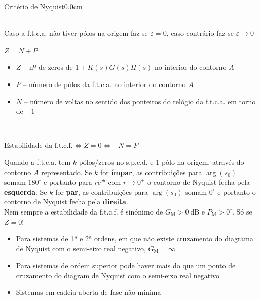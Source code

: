 \documentclass[portuguese,10pt,3col]{cheatsheet}
\begin{document}
\begin{multicols}{3}
\begin{cheatsheetbox}{Critério de Nyquist}{0.0cm}
    \begin{minipage}{0.4\textwidth}
        \hspace{-0.5cm}
        \scalebox{0.85}{} \\
        \footnotesize Caso a f.t.c.a. não tiver pólos na origem faz-se $\varepsilon = 0$, caso contrário faz-se $\varepsilon \to 0$
    \end{minipage}%
    \hspace{-0.5cm}
    \begin{minipage}{0.65\textwidth}
        \begin{center}
            $\boxed{Z = N + P}$
        \end{center}
        \begin{itemize}
            \item $Z$ -- nº de zeros de $1 + K(s)G(s)H(s)$ no interior do contorno $A$
            \item $P$ -- número de pólos da f.t.c.a. no interior do contorno $A$
            \item $N$ -- número de voltas no sentido dos ponteiros do relógio da f.t.c.a. em torno de $-1$
        \end{itemize}
    \end{minipage}
    \\
    \begin{center}
        $\boxed{\text{Estabilidade da f.t.c.f.} \Leftrightarrow Z = 0 \Leftrightarrow -N = P}$
    \end{center}
    Quando a f.t.c.a. tem $k$ pólos/zeros no s.p.c.d. e 1 pólo na origem, através do contorno $A$ representado. Se $k$ for \textbf{ímpar}, as contribuições para $\arg(s_0)$ somam $180^\circ$ e portanto para $re^{j\theta}$ com $r \to 0^+$ o contorno de Nyquist fecha pela \textbf{esquerda}. Se $k$ for \textbf{par}, as contribuições para $\arg(s_0)$ somam $0^\circ$ e portanto o contorno de Nyquist fecha pela \textbf{direita}. \\
    
    Nem sempre a estabilidade da f.t.c.f. é sinónimo de $G_\text{M} > 0 \ \text{dB}$ e $P_\text{M} > 0^\circ$. Só se $Z = 0$!
    \begin{itemize}
        \item Para sistemas de 1ª e 2ª ordens, em que não existe cruzamento do diagrama de Nyquist com o semi-eixo real negativo, $G_\text{M} = \infty$
        \item Para sistemas de ordem superior pode haver mais do que um ponto de cruzamento do diagram de Nyquist com o semi-eixo real negativo
        \item Sistemas em cadeia aberta de fase não mínima
    \end{itemize}
    

\end{cheatsheetbox}
\end{multicols}
\end{document}
